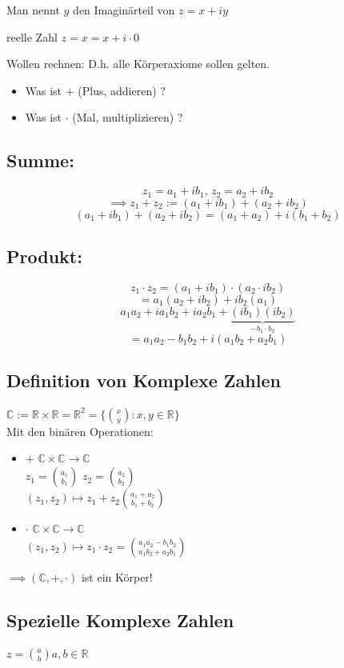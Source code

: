 \documentclass[fleqn]{scrbook}
\newcommand{\qq}[1]{\glqq #1\grqq}
\begin{document}
Man nennt $y$ den Imaginärteil von $z=x+iy$

reelle Zahl $z=x=x+i \cdot 0$

Wollen rechnen: D.h. alle Körperaxiome sollen gelten.

\begin{itemize}
 \item Was ist \qq{$+$} (Plus, addieren) ?
 \item Was ist \qq{$ \cdot $} (Mal, multiplizieren) ?
\end{itemize}

\subsection{Summe:} $$z_1 = a_1 + ib_1 \text{, } z_2 = a_2 + ib_2$$ $$\implies z_1 + z_2 := (a_1 + ib_1) + (a_2+ib_2)$$ $$(a_1 + ib_1) + (a_2+ib_2) = (a_1 + a_2) + i(b_1+b_2)$$

\subsection{Produkt:} $$z_1  \cdot  z_2 = (a_1 + ib_1)  \cdot  (a_2  \cdot  ib_2)$$ 
$$=a_1(a_2 + ib_2) + ib_2(a_1)$$
$$a_1a_2 + ia_1b_2 + ia_2b_1 + \underbrace{(ib_1)(ib_2)}_{-b_1 \cdot b_2}$$
$$=a_1a_2 -b_1b_2 + i(a_1b_2 + a_2b_1)$$

\subsection{Definition von Komplexe Zahlen}
$\mathbb{C} := \mathbb{R} \times \mathbb{R} = \mathbb{R}^2=\{\binom{x}{y}:x,y \in \mathbb{R}\}$\\
Mit den binären Operationen:
\begin{itemize}
\item \qq{$+$} $\mathbb{C} \times \mathbb{C} \rightarrow \mathbb{C}$\\ $z_1 = \binom{a_1}{b_1}$ $z_2 = \binom{a_2}{b_2}$\\ $(z_1, z_2) \mapsto z_1 + z_2 \binom{a_1 + a_2}{b_1 + b_2}$
\item \qq{$ \cdot $} $\mathbb{C} \times \mathbb{C} \rightarrow \mathbb{C}$\\$(z_1, z_2) \mapsto z_1  \cdot  z_2 = \binom{a_1a_2 - b_1b_2}{a_1b_2+a_2b_1}$
\end{itemize}
$\implies (\mathbb{C},+, \cdot )$ ist ein Körper!
\subsection{Spezielle Komplexe Zahlen}
$z=\binom{a}{b} a,b \in \mathbb{R}$
\end{document}
